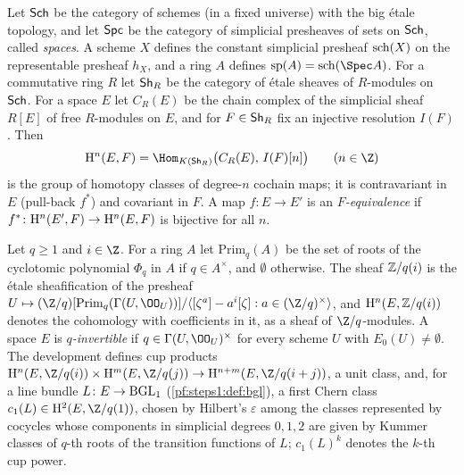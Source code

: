 \begin{definition}\label{pf:steps1:def:coh}
Let $\mathsf{Sch}$ be the category of schemes (in a fixed universe) with the big \'etale topology, and
let $\mathsf{Spc}$ be the category of simplicial presheaves of sets on $\mathsf{Sch}$, called
\emph{spaces}. A scheme $X$ defines the constant simplicial presheaf $\mathrm{sch}(X)$ on the
representable presheaf $h_X$, and a ring $A$ defines $\stepsIsp(A)=\stepsIsch(\Spec A)$. For a
commutative ring $R$ let $\mathsf{Sh}_R$ be the category of \'etale sheaves of $R$-modules on
$\mathsf{Sch}$. For a space $E$ let $C_R(E)$ be the chain complex of the simplicial sheaf $R[E]$ of
free $R$-modules on $E$, and for $F\in\mathsf{Sh}_R$ fix an injective resolution $I(F)$. Then
\[
 \stepsIH^n(E,F)=\Hom_{K(\stepsISh_R)}\bigl(C_R(E),\,I(F)[n]\bigr)\qquad(n\in\Z)
\]
is the group of homotopy classes of degree-$n$ cochain maps; it is contravariant in $E$ (pull-back
$f^*$) and covariant in $F$. A map $f\colon E\to E'$ is an \emph{$F$-equivalence} if
$f^*\colon\mathrm{H}^n(E',F)\to\mathrm{H}^n(E,F)$ is bijective for all $n$.
  
\end{definition}

\begin{definition}\label{pf:steps1:def:tw}
Let $q\ge1$ and $i\in\Z$. For a ring $A$ let $\mathrm{Prim}_q(A)$ be the set of roots of the
cyclotomic polynomial $\Phi_q$ in $A$ if $q\in A^\times$, and $\emptyset$ otherwise. The sheaf
$\mathbb{Z}/q(i)$ is the \'etale sheafification of the presheaf
$U\mapsto(\Z/q)[\mathrm{Prim}_q(\Gamma(U,\OO_U))]/\langle[\zeta^a]-a^i[\zeta]:a\in(\Z/q)^\times\rangle$,
and $\mathrm{H}^n(E,\mathbb{Z}/q(i))$ denotes the cohomology with coefficients in it, as a sheaf of
$\Z/q$-modules. A space $E$ is \emph{$q$-invertible} if $q\in\Gamma(U,\OO_U)^\times$ for every scheme
$U$ with $E_0(U)\ne\emptyset$. The development defines cup products
$\stepsIH^n(E,\Z/q(i))\times\stepsIH^m(E,\Z/q(j))\to\stepsIH^{n+m}(E,\Z/q(i+j))$, a unit class, and, for
a line bundle $L\colon E\to\mathrm{BGL}_1$ (\cref{pf:steps1:def:bgl}), a first Chern class
$c_1(L)\in\stepsIH^2(E,\Z/q(1))$, chosen by Hilbert's $\varepsilon$ among the classes represented by
cocycles whose components in simplicial degrees $0,1,2$ are given by Kummer classes of $q$-th roots of
the transition functions of $L$; $c_1(L)^k$ denotes the $k$-th cup power.
  
 
\end{definition}


